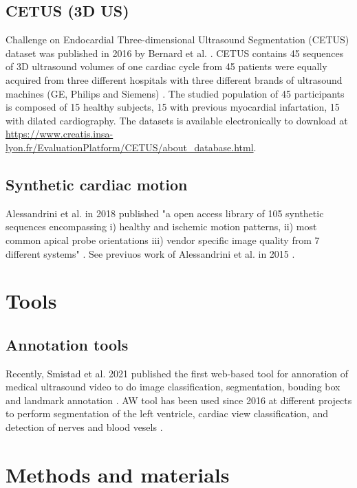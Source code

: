\subsection{CETUS (3D US)}
Challenge on Endocardial Three-dimensional Ultrasound Segmentation (CETUS) dataset was published in 2016 by Bernard et al. \cite{bernard2016TMI}.
CETUS contains 45 sequences of 3D ultrasound volumes of one cardiac cycle from 45 patients were equally acquired from three different hospitals with three different brands of ultrasound machines (GE, Philips and Siemens) \cite{bernard2016TMI}.
The studied population of 45 participants is composed of 15 healthy subjects, 15 with previous myocardial infartation, 15 with dilated cardiography.
The datasets is available electronically to download at \url{https://www.creatis.insa-lyon.fr/EvaluationPlatform/CETUS/about_database.html}.

\subsection{Synthetic cardiac motion}
Alessandrini et al. in 2018 published "a open access library of 105 synthetic sequences encompassing i) healthy and ischemic motion patterns, ii) most common apical probe orientations iii) vendor specific image quality from 7 different systems" \cite{alessandrini2018}.
See previuos work of Alessandrini et al. in 2015  \cite{alessandrini2015_isbi}.

\section{Tools}

\subsection{Annotation tools}
Recently, Smistad et al. 2021 published the first web-based tool for annoration of medical ultrasound video to do image classification, segmentation, bouding box and landmark annotation  \cite{smistad2021-A-IUS}.
AW tool has been used since 2016 at different projects to perform segmentation of the left ventricle, cardiac view classification, and detection of nerves and blood vesels \cite{smistad2021-A-IUS}.

\section{Methods and materials}

